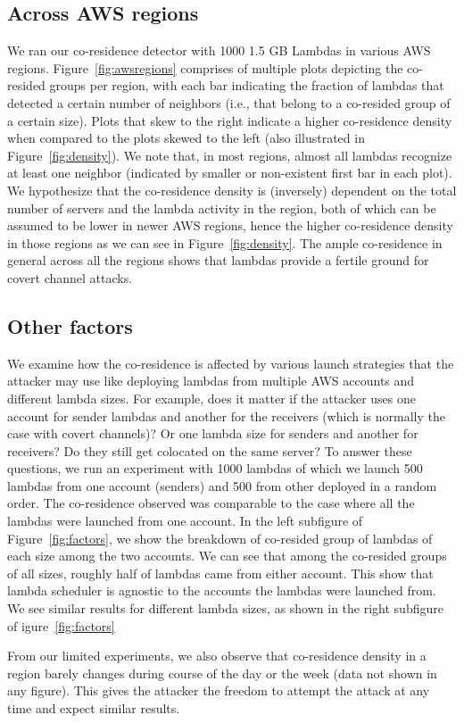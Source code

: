 \subsection{Across AWS regions}
We ran our co-residence detector with 1000 1.5 GB
Lambdas in various AWS regions. Figure~\ref{fig:awsregions} comprises of multiple plots depicting
the co-resided groups per region, with each bar indicating the fraction of
lambdas that detected a certain number of neighbors (i.e., that belong to a
co-resided group of a certain size). Plots that skew to the right indicate a
higher co-residence density when compared to the plots skewed to the left (also
illustrated in Figure~\ref{fig:density}). We note that, in most regions, almost
all lambdas recognize at least one neighbor (indicated by smaller or non-existent first 
bar in each plot). We hypothesize that the co-residence density is (inversely) dependent on the 
total number of servers and the lambda activity in the region, both of which can be assumed
to be lower in newer AWS regions, hence the higher co-residence density in those regions 
as we can see in Figure~\ref{fig:density}. The ample co-residence in general across all the 
regions shows that lambdas provide a fertile ground for covert channel attacks.


\subsection{Other factors}
We examine how the co-residence is affected by various launch strategies that the 
attacker may use like deploying lambdas from multiple AWS accounts
and different lambda sizes. For example, does it matter if the attacker 
uses one account for sender lambdas and another for the receivers (which is 
normally the case with covert channels)? Or one lambda size for senders 
and another for receivers? Do they still get colocated on the same server?
To answer these questions, we run an experiment with 1000 lambdas of which we 
launch 500 lambdas from one account (senders) and 500 from other deployed in 
a random order. The co-residence observed was comparable to the case where all 
the lambdas were launched from one account. In the left subfigure of Figure~\ref{fig:factors},
we show the breakdown of co-resided group of lambdas of each size among the two accounts.
We can see that among the co-resided groups of all sizes, roughly half of 
lambdas came from either account. This show that lambda scheduler is agnostic 
to the accounts the lambdas were launched from. We see similar results for 
different lambda sizes, as shown in the right subfigure of igure~\ref{fig:factors}

From our limited experiments, we also observe that co-residence density in a region 
barely changes during course of the day or the week (data not shown in any figure).
This gives the attacker the freedom to attempt the attack at any time and expect 
similar results.
